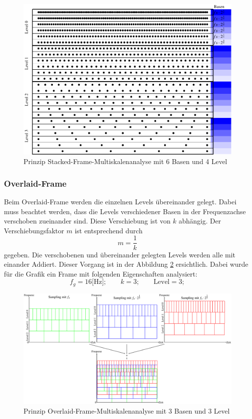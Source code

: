 \begin{figure}[!ht]
	\centering
	\includegraphics[width=\linewidth]{papers/autotune/sections/frames/images/msa/msa.pdf}
	\caption{Prinzip Stacked-Frame-Multiskalenanalyse mit 6 Basen und 4 Level}\label{fig:Stacked_frame}
\end{figure}%

\newpage


\subsubsection{Overlaid-Frame}

Beim Overlaid-Frame werden die einzelnen Levels übereinander gelegt. Dabei muss beachtet werden, dass die Levels verschiedener Basen in der Frequenzachse verschoben zueinander sind. Diese Verschiebung ist von $k$ abhängig. Der Verschiebungsfaktor $m$ ist entsprechend durch
\[
m= \frac{1}{k}
\]
gegeben. Die verschobenen und übereinander gelegten Levels werden alle mit einander Addiert. Dieser Vorgang ist in der Abbildung \ref{fig:Overlaid_frame} ersichtlich. Dabei wurde für die Grafik ein Frame mit folgenden Eigenschaften analysiert:
\[ 
f_{g}=16\text{[Hz]}; \qquad
k = 3; \qquad
\text{Level} = 3; 
\]

\begin{figure}[!ht]
	\centering
	\includegraphics[width=\linewidth]{papers/autotune/sections/frames/images/frame/msa.pdf}
	\caption{Prinzip Overlaid-Frame-Multiskalenanalyse mit 3 Basen und 3 Level}\label{fig:Overlaid_frame}
\end{figure}%


